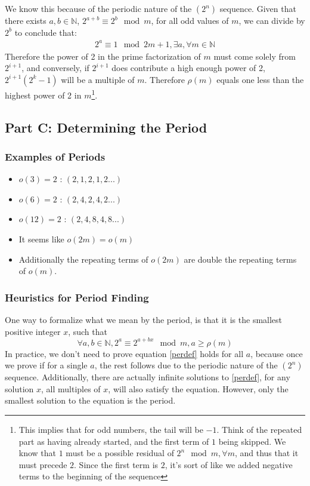\documentclass{article}
\begin{document}
  We know this because of the periodic nature of the $(2^n)$ sequence. Given that there exists $a, b \in \mathbb{N}$, $2^{a+b} \equiv 2^b \mod m$, for all odd values of $m$, we can divide by $2^b$ to conclude that:
  \begin{align}
    2^a \equiv 1 \mod 2m+1, \exists a, \forall m \in \mathbb{N}
  \end{align}
  Therefore the power of 2 in the prime factorization of $m$ must come solely from $2^{i+1}$, and conversely, if $2^{i+1}$ does contribute a high enough power of 2, $2^{i+1}(2^k-1)$ will be a multiple of $m$. Therefore $\rho(m)$ equals one less than the highest power of 2 in $m$\footnote{This implies that for odd numbers, the tail will be $-1$. Think of the repeated part as having already started, and the first term of $1$ being skipped. We know that $1$ must be a possible residual of $2^n \mod m, \forall m$, and thus that it must precede $2$. Since the first term is $2$, it's sort of like we added negative terms to the beginning of the sequence}.
  \subsection{Part C: Determining the Period}
  \subsubsection{Examples of Periods}
  \begin{itemize}
  \item $o(3) = 2$ : $(2, 1, 2, 1, 2 ...)$
  \item $o(6) = 2$ : $(2, 4, 2, 4, 2 ...)$
  \item $o(12)= 2$ : $(2, 4, 8, 4, 8 ...)$
  \item It seems like $o(2m) = o(m)$
  \item Additionally the repeating terms of $o(2m)$ are double the repeating terms of $o(m)$.
  \end{itemize}
  \subsubsection{Heuristics for Period Finding}
  One way to formalize what we mean by the period, is that it is the smallest positive integer $x$, such that
  \begin{equation}\label{perdef}
    \forall a, b \in \mathbb{N}, 2^a \equiv 2^{a+bx} \mod m, a \geq \rho(m)
  \end{equation}
  In practice, we don't need to prove equation \eqref{perdef} holds for all $a$, because once we prove if for a single $a$, the rest follows due to the periodic nature of the $(2^n)$ sequence. Additionally, there are actually infinite solutions to \eqref{perdef}, for any solution $x$, all multiples of $x$, will also satisfy the equation. However, only the smallest solution to the equation is the period.\\
  
\end{document}
